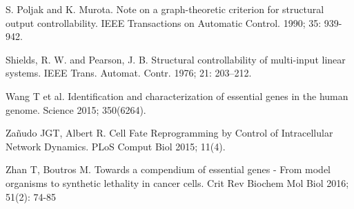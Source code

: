 \documentclass[oribibl]{llncs}
\begin{document}
\begin{thebibliography}{xx}
S. Poljak and K. Murota. Note on a graph-theoretic criterion for structural output controllability. IEEE Transactions on Automatic Control. 1990; 35: 939-942.

Shields, R. W. and Pearson, J. B. Structural controllability of multi-input linear
systems.
IEEE Trans. Automat. Contr. 1976; 21: 203–212.




Wang T et al. Identification and characterization of essential genes in the human genome. Science 2015; 350(6264).


Za\~{n}udo JGT, Albert R. Cell Fate Reprogramming by Control of Intracellular Network Dynamics. PLoS Comput Biol 2015; 11(4).

Zhan T, Boutros M. Towards a compendium of essential genes - From model organisms to synthetic lethality in cancer cells. Crit Rev Biochem Mol Biol 2016; 51(2): 74-85


\end{thebibliography}
%
\end{document}
